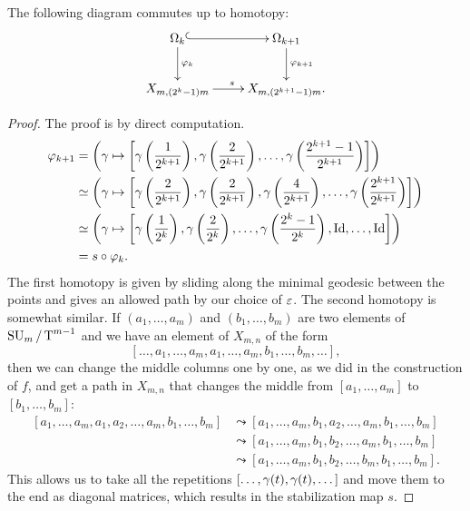 \begin{lemma}
  \label{lem:com}
  The following diagram commutes up to homotopy:
  \[ \xymatrix{\Omega_k \ar@{^(->}[r] \ar[d]^{\varphi_k} & \Omega_{k+1}
  \ar[d]^{\varphi_{k+1}} \\
  X_{m,(2^k-1)m} \ar[r]^{s} & X_{m,(2^{k+1}-1)m}. } \]
\end{lemma}
\begin{proof}
  The proof is by direct computation.
  \begin{align*}
    \varphi_{k+1} &= \left( \gamma \mapsto \left[
        \gamma\left(\frac{1}{2^{k+1}}\right),
        \gamma\left(\frac{2}{2^{k+1}}\right), \dots,
        \gamma\left(\frac{2^{k+1}-1}{2^{k+1}}\right) \right]\right) \\
    &\simeq \left(\gamma \mapsto \left[ \gamma\left(\frac{2}{2^{k+1}}\right),
      \gamma\left(\frac{2}{2^{k+1}}\right),
      \gamma\left(\frac{4}{2^{k+1}}\right), \dots,
      \gamma\left(\frac{2^{k+1}}{2^{k+1}}\right) \right]\right) \\
    &\simeq \left(\gamma\mapsto \left[ \gamma\left(\frac{1}{2^{k}}\right),
      \gamma\left(\frac{2}{2^{k}}\right), \dots,
      \gamma\left(\frac{2^k-1}{2^k}\right), \operatorname{Id},\dots,\operatorname{Id} \right] \right)\\
    &= s\circ \varphi_k.
  \end{align*}
  The first homotopy is given by sliding along the minimal geodesic
  between the points and gives an allowed path by our choice of
  $\varepsilon$. The second homotopy is somewhat similar. If $(a_1,\dots,a_m)$
  and $(b_1,\dots,b_m)$ are two elements of $\operatorname{SU}_{m}/\operatorname{T}^{m-1}$ and we have an
  element of $X_{m,n}$ of the form
  \[ \left[ \dots, a_1,\dots,a_m,a_1,\dots,a_m,b_1,\dots,b_m,\dots
  \right], \]
  then we can change the middle columns one by one, as we did in
  the construction of $f$, and get a path in $X_{m,n}$ that changes
  the middle from $[a_1,\dots,a_m]$ to $[b_1,\dots,b_m]$:
  \begin{align*}
    \left[a_1,\dots,a_m,a_1,a_2,\dots,a_m,b_1,\dots,b_m \right] 
    &\leadsto
    \left[a_1,\dots,a_m,b_1,a_2,\dots,a_m,b_1,\dots,b_m\right] \\ 
    &\leadsto
    \left[a_1,\dots,a_m,b_1,b_2,\dots,a_m,b_1,\dots,b_m\right] \\  
    &\leadsto
    \left[a_1,\dots,a_m,b_1,b_2,\dots,b_m,b_1,\dots,b_m\right].  
  \end{align*}
  This allows us to take all the repetitions
  $\left[\dots,\gamma(t),\gamma(t),\dots\right]$ and move them to the end as
  diagonal matrices, which results in the stabilization map $s$.
\end{proof}

